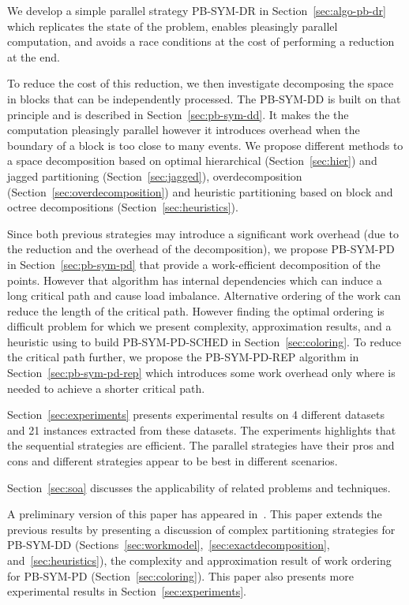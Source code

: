 \documentclass{article}
\begin{document}
We develop a simple parallel strategy PB-SYM-DR in
Section~\ref{sec:algo-pb-dr} which replicates the state of the
problem, enables pleasingly parallel computation, and avoids a race
conditions at the cost of performing a reduction at the end.

To reduce the cost of this reduction, we then investigate decomposing
the space in blocks that can be independently processed. The PB-SYM-DD
is built on that principle and is described in
Section~\ref{sec:pb-sym-dd}. It makes the the computation pleasingly
parallel however it introduces overhead when the boundary of a block
is too close to many events. We propose different methods to a space
decomposition based on optimal hierarchical (Section~\ref{sec:hier})
and jagged partitioning (Section~\ref{sec:jagged}), overdecomposition
(Section~\ref{sec:overdecomposition}) and heuristic partitioning based
on block and octree decompositions (Section~\ref{sec:heuristics}).


Since both previous strategies may introduce a significant work
overhead (due to the reduction and the overhead of the decomposition),
we propose PB-SYM-PD in Section~\ref{sec:pb-sym-pd} that provide a
work-efficient decomposition of the points. However that algorithm has
internal dependencies which can induce a long critical path and cause
load imbalance. Alternative ordering of the work can reduce the length
of the critical path. However finding the optimal ordering is
difficult problem for which we present complexity, approximation
results, and a heuristic using to build PB-SYM-PD-SCHED in
Section~\ref{sec:coloring}.  To reduce the critical path further, we
propose the PB-SYM-PD-REP algorithm in Section~\ref{sec:pb-sym-pd-rep}
which introduces some work overhead only where is needed to achieve a
shorter critical path.

Section~\ref{sec:experiments} presents experimental results on 4
different datasets and 21 instances extracted from these datasets. The
experiments highlights that the sequential strategies are
efficient. The parallel strategies have their pros and cons and
different strategies appear to be best in different
scenarios.

Section~\ref{sec:soa} discusses the applicability of related problems
and techniques.

A preliminary version of this paper has appeared
in~\cite{Saule17-ICPP}. This paper extends the previous results by
presenting a discussion of complex partitioning strategies for
PB-SYM-DD (Sections~\ref{sec:workmodel},~\ref{sec:exactdecomposition},
and~\ref{sec:heuristics}), the complexity and approximation result of
work ordering for PB-SYM-PD (Section~\ref{sec:coloring}). This paper also presents
more experimental results in Section~\ref{sec:experiments}.
\end{document}
